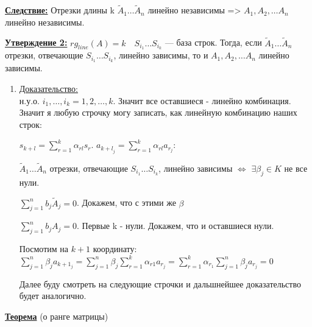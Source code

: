 \documentclass[twoside]{book}
\newcommand{\deff}[1]{\underline{\textbf{#1}}}
\newcommand{\prooff}[1]{{\underline{Доказательство:}} \\ }
\begin{document}
\textbf{\underline{Следствие:}} Отрезки длины k $ \widetilde{A}_1 \ldots \widetilde{A}_n $ линейно независимы => $ A_1, A_2, \ldots A_n $ линейно независимы.

\textbf{\underline{Утверждение 2:}}
\( rg_{line}(A) = k \quad S_{i_1} \ldots S_{i_k}\) --- база строк. Тогда, если $ \widetilde{A}_1 \ldots \widetilde{A}_n $ отрезки, отвечающие $ S_{i_1} \ldots S_{i_k} $, линейно зависимы, то и $ A_1, A_2, \ldots A_n $ линейно зависимы.

\begin{enumerate}
    \item[] \prooff{}
          н.у.о. $i_1,\ldots,i_k = 1,2,\ldots, k$. Значит все оставшиеся - линейно комбинация.
          Значит я любую строчку могу записать, как линейную комбинацию наших строк:

          $s_{k+l}= \sum\limits_{r=1}^k \alpha_{rl}s_r$. $a_{{k+l}_j}=\sum\limits_{r=1}^k \alpha_{rl}a_{r_j}$:

          $ \widetilde{A}_1 \ldots \widetilde{A}_n $ отрезки, отвечающие $ S_{i_1} \ldots S_{i_k} $, линейно зависимы $\Leftrightarrow$ $\exists \beta_j \in K$ не все нули.

          $\sum\limits_{j=1}^n{b_j \widetilde{A}_j}=0$. Докажем, что с этими же $\beta$

          $\sum\limits_{j=1}^n b_j A_j = 0$. Первые k - нули. Докажем, что и оставшиеся нули.

          Посмотим на $k+1$ координату: $\sum\limits_{j=1}^n \beta_j a_{k+1_{j}} = \sum\limits_{j=1}^n \beta_j \sum\limits_{r=1}^k \alpha_{r1}a_{r_{j}} = \sum\limits_{r=1}^k \alpha_{r_1}\sum\limits_{j=1}^n \beta_j a_{r_{j}} =0$

          Далее буду смотреть на следующие строчки и дальшнейшее доказательство будет аналогично.


\end{enumerate}

\deff{Теорема} (о ранге матрицы)
\end{document}
